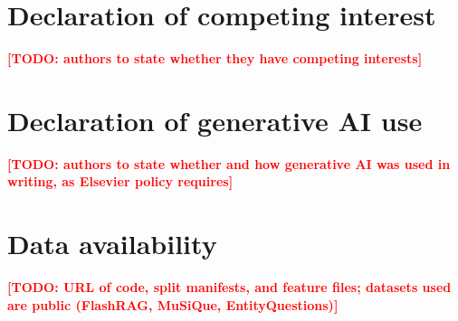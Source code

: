 \documentclass[preprint,12pt,authoryear]{elsarticle}
\newcommand{\TODO}[1]{\textbf{\textcolor{red}{[TODO: #1]}}}
\begin{document}
\section*{Declaration of competing interest}
\TODO{authors to state whether they have competing interests}

\section*{Declaration of generative AI use}
\TODO{authors to state whether and how generative AI was used in writing, as Elsevier policy requires}

\section*{Data availability}
\TODO{URL of code, split manifests, and feature files; datasets used are public (FlashRAG, MuSiQue, EntityQuestions)}



\end{document}
